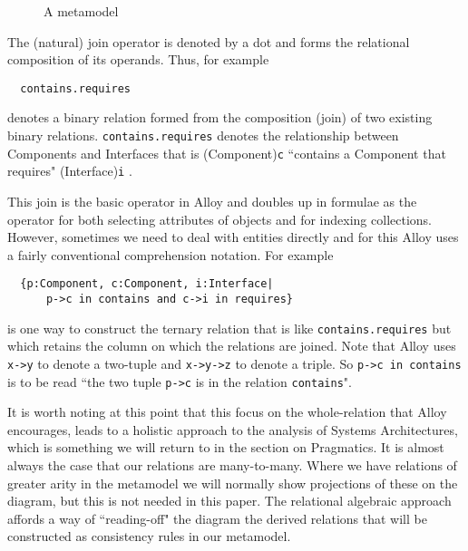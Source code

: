 \documentclass[a4paper,twoside]{article}
\begin{document}
%
\begin{figure}[!h]
  \centering
   {}
  \caption{A metamodel}
  \label{fig:fig3}
\end{figure}
%
The (natural) join operator is denoted by a dot and forms the relational composition of its operands. Thus, for example
\begin{small}
\begin{verbatim}
  contains.requires
\end{verbatim}
\end{small}
denotes a binary relation formed from the composition (join) of two existing binary relations. {\small\verb$contains.requires$} denotes the relationship between Components and Interfaces 
that is (Component){\small\verb$c$} 
``contains a Component that requires" 
(Interface){\small\verb$i$} . 

This join is the basic operator in Alloy and doubles up in formulae as the operator for both selecting attributes of objects and for indexing collections. However, sometimes we need to deal with entities directly and for this Alloy uses a fairly conventional comprehension notation. For example
\begin{small}
\begin{verbatim}
  {p:Component, c:Component, i:Interface|
      p->c in contains and c->i in requires}
\end{verbatim}
\end{small}
is one way to construct the ternary relation that is like {\small\verb$contains.requires$} but which retains the column on which the relations are joined. Note that Alloy uses {\small\verb$x->y$} to denote a two-tuple and {\small\verb$x->y->z$} to denote a triple. So {\small\verb$p->c in contains$} is to be read ``the two tuple {\small\verb$p->c$} is in the relation {\small\verb$contains$}". 

It is worth noting at this point that this focus on the whole-relation that Alloy encourages, leads to a holistic approach to the analysis of Systems Architectures, which is something we will return to in the section on Pragmatics. It is almost always the case that our relations are many-to-many. Where we have relations of greater arity in the metamodel we will normally show projections of these on the diagram, but this is not needed in this paper. The relational algebraic approach affords a way of ``reading-off" the diagram the derived relations that will be constructed as consistency rules in our metamodel.
\end{document}
